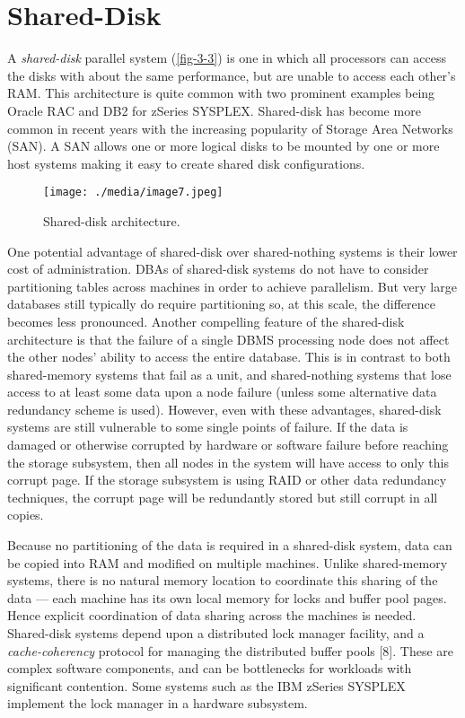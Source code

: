 \documentclass[a4paper,11pt,twoside,openright]{book}
\begin{document}
\hypertarget{shared-disk}{%
\section{Shared-Disk}\label{shared-disk}}

A \emph{shared-disk} parallel system (\autoref{fig-3-3}) is one in which all
processors can access the disks with about the same performance, but are
unable to access each other's RAM. This architecture is quite common
with two prominent examples being Oracle RAC and DB2 for zSeries
SYSPLEX. Shared-disk has become more common in recent years with the
increasing popularity of Storage Area Networks (SAN). A SAN allows one
or more logical disks to be mounted by one or more host systems making
it easy to create shared disk configurations.

\begin{figure}
\centering
\texttt{[image: ./media/image7.jpeg]}

\caption{Shared-disk architecture.\label{fig-3-3}}
\end{figure}

One potential advantage of shared-disk over shared-nothing systems is
their lower cost of administration. DBAs of shared-disk systems do not
have to consider partitioning tables across machines in order to achieve
parallelism. But very large databases still typically do require
partitioning so, at this scale, the difference becomes less pronounced.
Another compelling feature of the shared-disk architecture is that the
failure of a single DBMS processing node does not affect the other
nodes' ability to access the entire database. This is in contrast to
both shared-memory systems that fail as a unit, and shared-nothing
systems that lose access to at least some data upon a node failure
(unless some alternative data redundancy scheme is used). However, even
with these advantages, shared-disk systems are still vulnerable to some
single
points of failure. If the data is damaged or otherwise corrupted by
hardware or software failure before reaching the storage subsystem,
then all nodes in the system will have access to only this corrupt page.
If the storage subsystem is using RAID or other data redundancy
techniques, the corrupt page will be redundantly stored but still
corrupt in all copies.

Because no partitioning of the data is required in a shared-disk system,
data can be copied into RAM and modified on multiple machines. Unlike
shared-memory systems, there is no natural memory location to coordinate
this sharing of the data --- each machine has its own local memory for
locks and buffer pool pages. Hence explicit coordination of data sharing
across the machines is needed. Shared-disk systems depend upon a
distributed lock manager facility, and a \emph{cache-coherency} protocol
for managing the distributed buffer pools {[}8{]}. These are complex
software components, and can be bottlenecks for workloads with
significant contention. Some systems such as the IBM zSeries SYSPLEX
implement the lock manager in a hardware subsystem.
\end{document}
